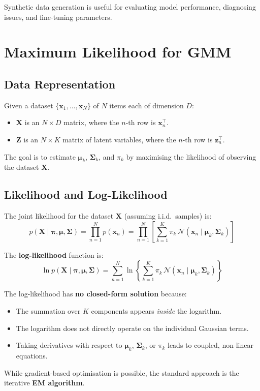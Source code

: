 \documentclass[11pt,a4paper]{article}
\theoremstyle{definition}
\theoremstyle{plain}
\theoremstyle{remark}
\begin{document}
Synthetic data generation is useful for evaluating model performance, diagnosing issues, and fine-tuning parameters.

\section{Maximum Likelihood for GMM}

\subsection{Data Representation}

Given a dataset $\{\mathbf{x}_1, \dots, \mathbf{x}_N\}$ of $N$ items each of dimension $D$:
\begin{itemize}
    \item $\mathbf{X}$ is an $N \times D$ matrix, where the $n$-th row is $\mathbf{x}_n^\top$.
    \item $\mathbf{Z}$ is an $N \times K$ matrix of latent variables, where the $n$-th row is $\mathbf{z}_n^\top$.
\end{itemize}

The goal is to estimate $\boldsymbol{\mu}_k$, $\boldsymbol{\Sigma}_k$, and $\pi_k$ by maximising the likelihood of observing the dataset $\mathbf{X}$.

\subsection{Likelihood and Log-Likelihood}

The joint likelihood for the dataset $\mathbf{X}$ (assuming i.i.d.\ samples) is:
\[
p(\mathbf{X} \mid \boldsymbol{\pi}, \boldsymbol{\mu}, \boldsymbol{\Sigma}) = \prod_{n=1}^{N} p(\mathbf{x}_n) = \prod_{n=1}^{N} \left[ \sum_{k=1}^{K} \pi_k \, \mathcal{N}(\mathbf{x}_n \mid \boldsymbol{\mu}_k, \boldsymbol{\Sigma}_k) \right]
\]

The \textbf{log-likelihood} function is:
\[
\ln p(\mathbf{X} \mid \boldsymbol{\pi}, \boldsymbol{\mu}, \boldsymbol{\Sigma}) = \sum_{n=1}^{N} \ln \left\{ \sum_{k=1}^{K} \pi_k \, \mathcal{N}(\mathbf{x}_n \mid \boldsymbol{\mu}_k, \boldsymbol{\Sigma}_k) \right\}
\]

\begin{tcolorbox}[colback=red!5!white,colframe=red!75!black,title=\textbf{Why No Closed-Form Solution?}]
The log-likelihood has \textbf{no closed-form solution} because:
\begin{itemize}
    \item The summation over $K$ components appears \emph{inside} the logarithm.
    \item The logarithm does not directly operate on the individual Gaussian terms.
    \item Taking derivatives with respect to $\boldsymbol{\mu}_k$, $\boldsymbol{\Sigma}_k$, or $\pi_k$ leads to coupled, non-linear equations.
\end{itemize}
While gradient-based optimisation is possible, the standard approach is the iterative \textbf{EM algorithm}.
\end{tcolorbox}
\end{document}
